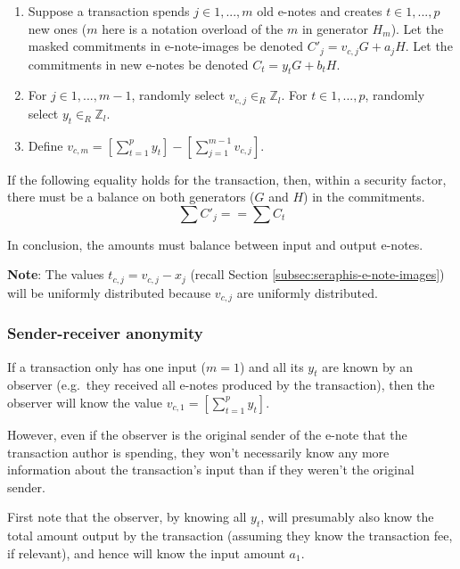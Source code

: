 \begin{enumerate}
    \item Suppose a transaction spends $j \in 1,...,m$ old e-notes and creates $t \in 1,...,p$ new ones ($m$ here is a notation overload of the $m$ in generator $H_m$). Let the masked commitments in e-note-images be denoted $C'_j = v_{c,j} G + a_j H$. Let the commitments in new e-notes be denoted $C_t = y_t G + b_t H$.

    \item For $j \in 1,...,m-1$, randomly select $v_{c,j} \in_R \mathbb{Z}_l$. For $t \in 1,...,p$, randomly select $y_t \in_R \mathbb{Z}_l$.

    \item Define $v_{c,m} = [\sum^{p}_{t=1} y_t] - [\sum^{m-1}_{j=1} v_{c,j}]$.
\end{enumerate}

If the following equality holds for the transaction, then, within a security factor, there must be a balance on both generators ($G$ and $H$) in the commitments.\vspace{.115cm}
\[\sum C'_j == \sum C_t\]

In conclusion, the amounts must balance between input and output e-notes.

\textbf{Note}: The values $t_{c,j} = v_{c,j} - x_j$ (recall Section \ref{subsec:seraphis-e-note-images}) will be uniformly distributed because $v_{c,j}$ are uniformly distributed.

\subsubsection{Sender-receiver anonymity}
\label{subsubsec:confidential-transactions-sender-receiver-anonymity}

If a transaction only has one input ($m = 1$) and all its $y_t$ are known by an observer (e.g.\ they received all e-notes produced by the transaction), then the observer will know the value $v_{c,1} = [\sum^{p}_{t=1} y_t]$.

However, even if the observer is the original sender of the e-note that the transaction author is spending, they won't necessarily know any more information about the transaction's input than if they weren't the original sender.

First note that the observer, by knowing all $y_t$, will presumably also know the total amount output by the transaction (assuming they know the transaction fee, if relevant), and hence will know the input amount $a_1$.


